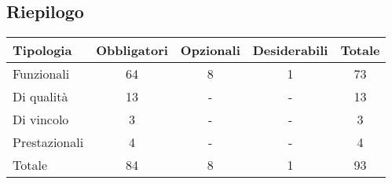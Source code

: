 \subsection{Riepilogo}
\begin{tabular}{|l|c|c|c|c|}
    \hline
    \textbf{Tipologia} & \textbf{Obbligatori} & \textbf{Opzionali} & \textbf{Desiderabili} & \textbf{Totale} \\
    \hline
    Funzionali & 64 & 8 & 1 & 73 \\
    \hline
    Di qualità & 13 & - & - & 13 \\
    \hline
    Di vincolo & 3 & - & - & 3 \\
    \hline
    Prestazionali & 4 & - & - & 4 \\
    \hline
    Totale & 84 & 8 & 1 & 93 \\
    \hline
\end{tabular}
